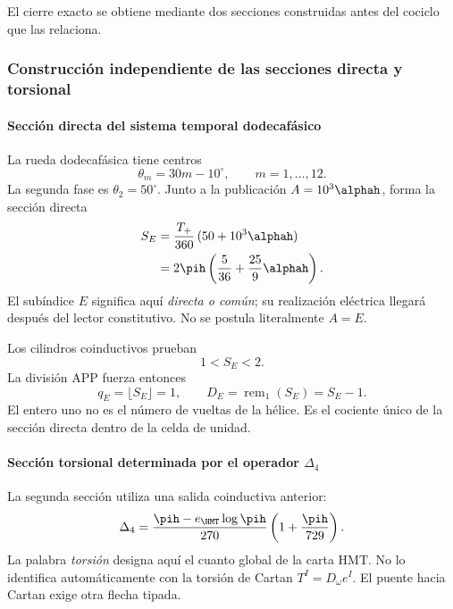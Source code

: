 \noindent El cierre exacto se obtiene mediante dos secciones construidas antes del cociclo que las relaciona.\par\medskip

\subsubsection{Construcción independiente de las secciones directa y torsional}

\paragraph{Sección directa del sistema temporal dodecafásico}

La rueda dodecafásica tiene centros
\begin{equation}
\theta_m=30m-10^\circ,\qquad m=1,\ldots,12.
\label{eq:rueda-dodecafasica}
\end{equation}
La segunda fase es \(\theta_2=50^\circ\). Junto a la publicación
\(A=10^3\alphah\), forma la sección directa
\begin{align}
S_E
&=\frac{T_+}{360}\,(50+10^3\alphah)\\
&=2\pih\left(\frac5{36}+\frac{25}{9}\alphah\right).
\label{eq:seccion-electrica}
\end{align}
El subíndice \(E\) significa aquí \emph{directa o común}; su realización
eléctrica llegará después del lector constitutivo. No se postula
literalmente \(A=E\).

Los cilindros coinductivos prueban
\begin{equation}
1<S_E<2.
\label{eq:SE-intervalo}
\end{equation}
La división APP fuerza entonces
\begin{equation}
q_E=\lfloor S_E\rfloor=1,
\qquad
D_E=\operatorname{rem}_1(S_E)=S_E-1.
\label{eq:DE}
\end{equation}
El entero uno no es el número de vueltas de la hélice. Es el cociente único
de la sección directa dentro de la celda de unidad.

\paragraph{Sección torsional determinada por el operador \(\Delta_4\)}

La segunda sección utiliza una salida coinductiva anterior:
\begin{equation}
\Delta_4=
\frac{\pih-e_{\HMT}\log\pih}{270}
\left(1+\frac{\pih}{729}\right).
\label{eq:delta4}
\end{equation}
La palabra \emph{torsión} designa aquí el cuanto global de la carta HMT. No
lo identifica automáticamente con la torsión de Cartan
\(T^I=D_\omega e^I\). El puente hacia Cartan exige otra flecha tipada.
